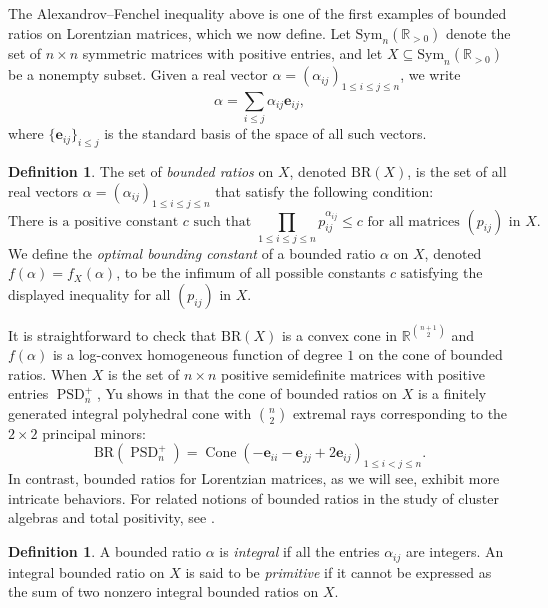 \documentclass{amsart}
\theoremstyle{definition}
\newtheorem{definition}[theorem]{Definition}
\theoremstyle{remark}
\def\RR{\mathbb{R}}
\def\BR{\mathrm{BR}}
\def\Sym{\mathrm{Sym}}
\begin{document}
The Alexandrov--Fenchel inequality above is one of the first examples of bounded ratios on Lorentzian matrices, which we now define. Let $\Sym_n(\RR_{> 0})$ denote the set of $n \times n$ symmetric matrices with positive entries, and let $X \subseteq \Sym_n(\RR_{> 0})$ be a nonempty subset.
Given a real vector $\alpha=(\alpha_{ij})_{1 \le  i \le j \le n}$, we write
\[
\alpha=\sum_{i \le j} \alpha_{ij} \mathbf{e}_{ij},
\]
where $\{\mathbf{e}_{ij}\}_{i \le j}$ is the standard basis of the space of all such vectors. 

\begin{definition}
The set of \emph{bounded ratios} on $X$, denoted $\BR(X)$, is the set of all real vectors $\alpha=(\alpha_{ij})_{1 \le  i \le j \le n}$
that satisfy the following condition:
\[
\text{There is a positive constant $c$ such that $\prod_{1\le i\le j\le n}p_{ij}^{\alpha_{ij}}\le c$ for all matrices $(p_{ij})$ in $X$.}
\]
We define the \emph{optimal bounding constant} of a bounded ratio $\alpha$ on $X$, denoted $f(\alpha)=f_X(\alpha)$,  to be the infimum of all possible constants $c$ satisfying the displayed inequality for all $(p_{ij})$ in $X$. 
\end{definition}

It is straightforward to check that $\BR(X)$ is a convex cone in $\RR^{\binom{n+1}{2}}$ and $f(\alpha)$ is a log-convex homogeneous function of degree $1$ on the cone of bounded ratios. 
When $X$ is the set of $n\times n$ positive semidefinite matrices with positive entries $\operatorname{PSD}^+_n$, %
Yu shows in \cite{Yu} that the cone of bounded ratios on $X$  is a finitely generated integral polyhedral cone with $\binom{n}{2}$ extremal rays corresponding to the $2 \times 2$ principal minors:
\[
\BR(\operatorname{PSD}^+_n)=\operatorname{Cone}(-\mathbf{e}_{ii}-\mathbf{e}_{jj}+2\mathbf{e}_{ij})_{1 \le i<j \le n}.
\]
In contrast, bounded ratios for Lorentzian matrices, as we will see, exhibit more intricate behaviors. 
For related notions of bounded ratios in the study of cluster algebras and total positivity, see \cite{Fallat-Johnson,Fallat-Gekhtman-Johnson,Gekhtman-Greenberg-Soskin,Gekhtman-Soskin}.

\begin{definition}
A bounded ratio $\alpha$ is \emph{integral} if all the entries $\alpha_{ij}$ are integers. 
An integral bounded ratio on $X$ is said to be \emph{primitive} if it cannot be expressed as the sum of two nonzero integral bounded ratios on $X$.
\end{definition}
\end{document}
